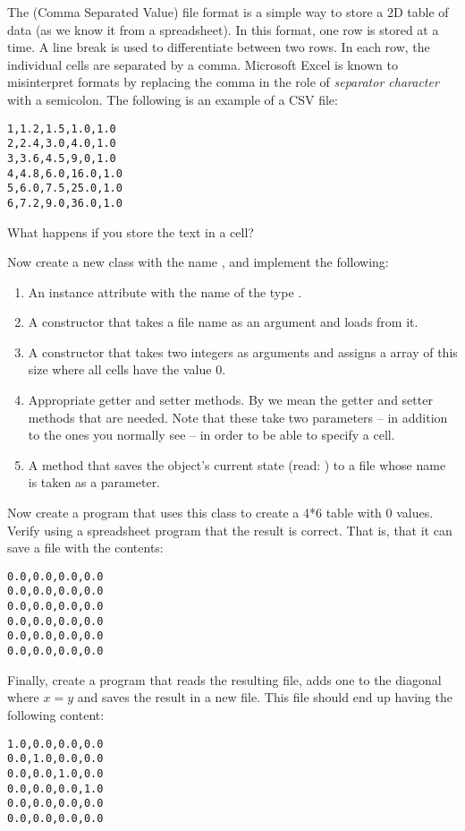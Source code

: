 The  (Comma Separated Value) file format is a simple way to store a 2D table of data (as we know it from a spreadsheet). In this format, one row is stored at a time. A line break is used to differentiate between two rows. In each row, the individual cells are separated by a comma. Microsoft Excel is known to misinterpret formats by replacing the comma in the role of \textsl{separator character} with a semicolon. The following is an example of a CSV file:

\begin{verbatim}
1,1.2,1.5,1.0,1.0
2,2.4,3.0,4.0,1.0
3,3.6,4.5,9,0,1.0
4,4.8,6.0,16.0,1.0
5,6.0,7.5,25.0,1.0
6,7.2,9.0,36.0,1.0
\end{verbatim}

What happens if you store the text  in a cell?

Now create a new class with the name , and implement the following:
\begin{enumerate}
  \item An instance attribute with the name  of the type .
  \item A constructor that takes a file name as an argument and loads  from it.
  \item A constructor that takes two integers as arguments and assigns  a  array of this size where all cells have the value 0.
  \item Appropriate getter and setter methods. By  we mean the getter and setter methods that are needed. Note that these take two  parameters -- in addition to the ones you normally see -- in order to be able to specify a cell.
  \item A  method that saves the object's current state (read: ) to a file whose name is taken as a parameter.
\end{enumerate}

Now create a program that uses this class to create a 4*6 table with 0 values. Verify using a spreadsheet program that the result is correct. That is, that it can save a file with the contents:

\begin{verbatim}
0.0,0.0,0.0,0.0
0.0,0.0,0.0,0.0
0.0,0.0,0.0,0.0
0.0,0.0,0.0,0.0
0.0,0.0,0.0,0.0
0.0,0.0,0.0,0.0
\end{verbatim}

Finally, create a program that reads the resulting file, adds one to the diagonal where $x=y$ and saves the result in a new file. This file should end up having the following content:

\begin{verbatim}
1.0,0.0,0.0,0.0
0.0,1.0,0.0,0.0
0.0,0.0,1.0,0.0
0.0,0.0,0.0,1.0
0.0,0.0,0.0,0.0
0.0,0.0,0.0,0.0
\end{verbatim}

